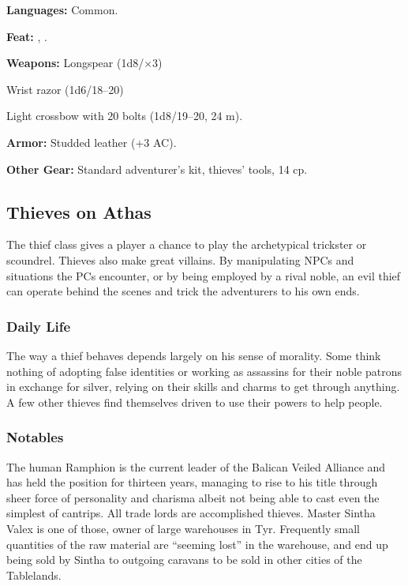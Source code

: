 \textbf{Languages:} Common.

\textbf{Feat:} , .

\textbf{Weapons:} Longspear (1d8/$\times$3)

Wrist razor (1d6/18--20)

Light crossbow with 20 bolts (1d8/19--20, 24 m).

\textbf{Armor:} Studded leather (+3 AC).

\textbf{Other Gear:} Standard adventurer's kit, thieves' tools, 14 cp.

\subsection{Thieves on Athas}

The thief class gives a player a chance to play the archetypical trickster or scoundrel. Thieves also make great villains. By manipulating NPCs and situations the PCs encounter, or by being employed by a rival noble, an evil thief can operate behind the scenes and trick the adventurers to his own ends.

\subsubsection{Daily Life}
The way a thief behaves depends largely on his sense of morality. Some think nothing of adopting false identities or working as assassins for their noble patrons in exchange for silver, relying on their skills and charms to get through anything. A few other thieves find themselves driven to use their powers to help people.

\subsubsection{Notables}
The human Ramphion is the current leader of the Balican Veiled Alliance and has held the position for thirteen years, managing to rise to his title through sheer force of personality and charisma albeit not being able to cast even the simplest of cantrips. All trade lords are accomplished thieves. Master Sintha Valex is one of those, owner of large warehouses in Tyr. Frequently small quantities of the raw material are ``seeming lost'' in the warehouse, and end up being sold by Sintha to outgoing caravans to be sold in other cities of the Tablelands.

